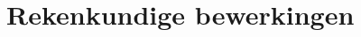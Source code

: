 \documentclass{tstextbook}
\begin{document}
% 
% 
% 
% 
% 
% 
% 
% 
% 
% 
% 
% 
% 
% 
\chapter{Rekenkundige bewerkingen}
\end{document}
